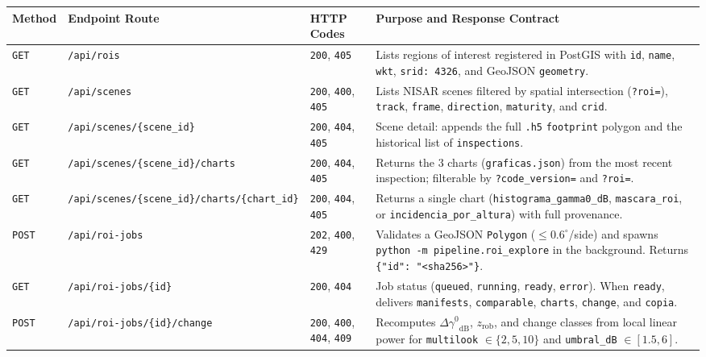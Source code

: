 \documentclass[11pt,a4paper]{article}
\newcommand{\gz}{\ensuremath{\gamma^{0}}}
\begin{document}
\begin{table}[htbp]
\centering
\footnotesize
\begin{tabular}{lp{4.3cm}p{2.3cm}p{6.6cm}}
\toprule
\textbf{Method} & \textbf{Endpoint Route} & \textbf{HTTP Codes} & \textbf{Purpose and Response Contract} \\
\midrule
\texttt{GET} & \texttt{/api/rois} & \texttt{200}, \texttt{405} & Lists regions of interest registered in PostGIS with \texttt{id}, \texttt{name}, \texttt{wkt}, \texttt{srid: 4326}, and GeoJSON \texttt{geometry}. \\
\texttt{GET} & \texttt{/api/scenes} & \texttt{200}, \texttt{400}, \texttt{405} & Lists NISAR scenes filtered by spatial intersection (\texttt{?roi=}), \texttt{track}, \texttt{frame}, \texttt{direction}, \texttt{maturity}, and \texttt{crid}. \\
\texttt{GET} & \texttt{/api/scenes/\{scene\_id\}} & \texttt{200}, \texttt{404}, \texttt{405} & Scene detail: appends the full \texttt{.h5} \texttt{footprint} polygon and the historical list of \texttt{inspections}. \\
\texttt{GET} & \texttt{/api/scenes/\{scene\_id\}/charts} & \texttt{200}, \texttt{404}, \texttt{405} & Returns the 3 charts (\texttt{graficas.json}) from the most recent inspection; filterable by \texttt{?code\_version=} and \texttt{?roi=}. \\
\texttt{GET} & \texttt{/api/scenes/\{scene\_id\}/charts/\{chart\_id\}} & \texttt{200}, \texttt{404}, \texttt{405} & Returns a single chart (\texttt{histograma\_gamma0\_dB}, \texttt{mascara\_roi}, or \texttt{incidencia\_por\_altura}) with full provenance. \\
\midrule
\texttt{POST} & \texttt{/api/roi-jobs} & \texttt{202}, \texttt{400}, \texttt{429} & Validates a GeoJSON \texttt{Polygon} ($\le 0.6^\circ$/side) and spawns \texttt{python -m pipeline.roi\_explore} in the background. Returns \texttt{\{"id": "<sha256>"\}}. \\
\texttt{GET} & \texttt{/api/roi-jobs/\{id\}} & \texttt{200}, \texttt{404} & Job status (\texttt{queued}, \texttt{running}, \texttt{ready}, \texttt{error}). When \texttt{ready}, delivers \texttt{manifests}, \texttt{comparable}, \texttt{charts}, \texttt{change}, and \texttt{copia}. \\
\texttt{POST} & \texttt{/api/roi-jobs/\{id\}/change} & \texttt{200}, \texttt{400}, \texttt{404}, \texttt{409} & Recomputes $\Delta\gz_{\mathrm{dB}}$, $z_{\mathrm{rob}}$, and change classes from local linear power for \texttt{multilook} $\in \{2,5,10\}$ and \texttt{umbral\_dB} $\in [1.5, 6]$. \\

\end{tabular}
\end{table}
\end{document}
